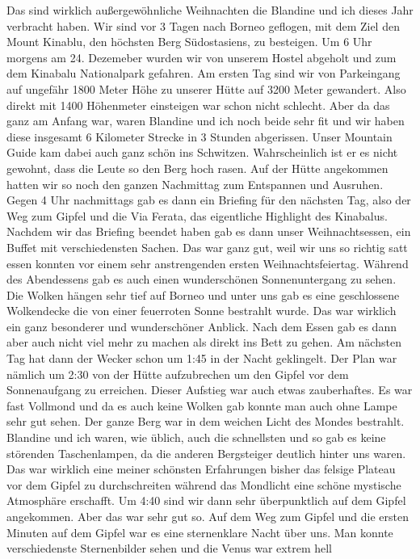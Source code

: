 \documentclass[11pt]{book}
\begin{document}
Das sind wirklich außergewöhnliche Weihnachten die Blandine und ich dieses Jahr verbracht haben. Wir sind vor 3 Tagen nach Borneo 
geflogen, mit dem Ziel den Mount Kinablu, den höchsten Berg Südostasiens, zu besteigen. Um 6 Uhr morgens am 24. Dezemeber wurden 
wir von unserem Hostel abgeholt und zum dem Kinabalu Nationalpark gefahren. Am ersten Tag sind wir von Parkeingang auf ungefähr 
1800 Meter Höhe zu unserer Hütte auf 3200 Meter gewandert. Also direkt mit 1400 Höhenmeter einsteigen war schon nicht schlecht. Aber 
da das ganz am Anfang war, waren Blandine und ich noch beide sehr fit und wir haben diese insgesamt 6 Kilometer Strecke in 3 Stunden 
abgerissen. Unser Mountain Guide kam dabei auch ganz schön ins Schwitzen. Wahrscheinlich ist er es nicht gewohnt, dass die Leute 
so den Berg hoch rasen. Auf der Hütte angekommen hatten wir so noch den ganzen Nachmittag zum Entspannen und Ausruhen. Gegen 4 Uhr 
nachmittags gab es dann ein Briefing für den nächsten Tag, also der Weg zum Gipfel und die Via Ferata, das eigentliche Highlight des 
Kinabalus. Nachdem wir das Briefing beendet haben gab es dann unser Weihnachtsessen, ein Buffet mit verschiedensten Sachen. Das 
war ganz gut, weil wir uns so richtig satt essen konnten vor einem sehr anstrengenden ersten Weihnachtsfeiertag. Während des Abendessens 
gab es auch einen wunderschönen Sonnenuntergang zu sehen. Die Wolken hängen sehr tief auf Borneo und unter uns gab es eine geschlossene 
Wolkendecke die von einer feuerroten Sonne bestrahlt wurde. Das war wirklich ein ganz besonderer und wunderschöner Anblick. Nach dem 
Essen gab es dann aber auch nicht viel mehr zu machen als direkt ins Bett zu gehen. Am nächsten Tag hat dann der Wecker schon um 
1:45 in der Nacht geklingelt. Der Plan war nämlich um 2:30 von der Hütte aufzubrechen um den Gipfel vor dem Sonnenaufgang zu erreichen.
Dieser Aufstieg war auch etwas zauberhaftes. Es war fast Vollmond und da es auch keine Wolken gab konnte man auch ohne Lampe 
sehr gut sehen. Der ganze Berg war in dem weichen Licht des Mondes bestrahlt. Blandine und ich waren, wie üblich, auch die schnellsten und 
so gab es keine störenden Taschenlampen, da die anderen Bergsteiger deutlich hinter uns waren. Das war wirklich eine meiner schönsten 
Erfahrungen bisher das felsige Plateau vor dem Gipfel zu durchschreiten während das Mondlicht eine schöne mystische Atmosphäre erschafft.
Um 4:40 sind wir dann sehr überpunktlich auf dem Gipfel angekommen. Aber das war sehr gut so. Auf dem Weg zum Gipfel und die ersten Minuten 
auf dem Gipfel war es eine sternenklare Nacht über uns. Man konnte verschiedenste Sternenbilder sehen und die Venus war extrem hell 
\end{document}
